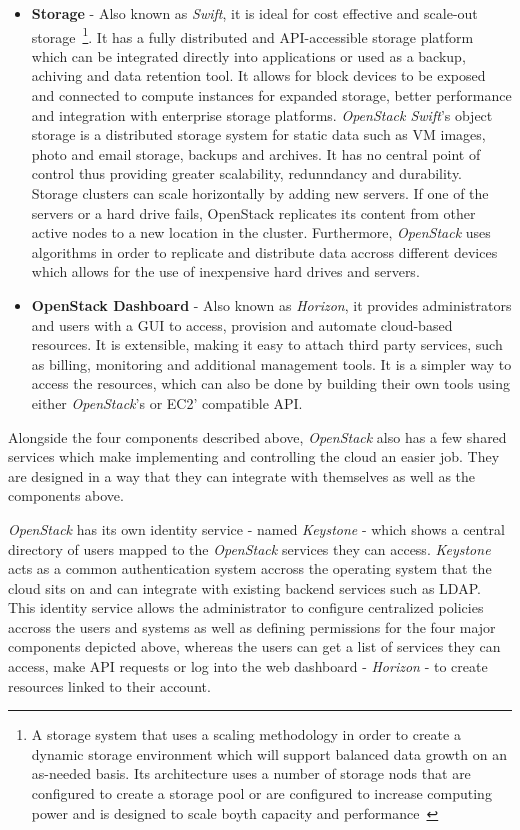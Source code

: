 \begin{itemize}
\item \textbf{Storage} - Also known as \textit{Swift}, it is ideal for cost effective and scale-out storage~\footnote{A storage system that uses a scaling methodology in order to create a dynamic storage environment which will support balanced data growth on an as-needed basis. Its architecture uses a number of storage nods that are configured to create a storage pool or are configured to increase computing power and is designed to scale boyth capacity and performance~\cite{http://www.webopedia.com/TERM/S/scale_out_storage.html}}. It has a fully distributed and API-accessible storage platform which can be integrated directly into applications or used as a backup, achiving and data retention tool. It allows for block devices to be exposed and connected to compute instances for expanded storage, better performance and integration with enterprise storage platforms. \textit{OpenStack Swift}'s object storage is a distributed storage system for static data such as VM images, photo and email storage, backups and archives. It has no central point of control thus providing greater scalability, redunndancy and durability. Storage clusters can scale horizontally by adding new servers. If one of the servers or a hard drive fails, OpenStack replicates its content from other active nodes to a new location in the cluster. Furthermore, \textit{OpenStack} uses algorithms in order to replicate and distribute data accross different devices which allows for the use of inexpensive hard drives and servers.
\item \textbf{OpenStack Dashboard} - Also known as \textit{Horizon}, it provides administrators and users with a GUI to access, provision and automate cloud-based resources. It is extensible, making it easy to attach third party services, such as billing, monitoring and additional management tools. It is a simpler way to access the resources, which can also be done by building their own tools using either \textit{OpenStack}'s or EC2' compatible API.
\end{itemize}

Alongside the four components described above, \textit{OpenStack} also has a few shared services which make implementing and controlling the cloud an easier job. They are designed in a way that they can integrate with themselves as well as the components above.

\textit{OpenStack} has its own identity service - named \textit{Keystone} - which shows a central directory of users mapped to the \textit{OpenStack} services they can access. \textit{Keystone} acts as a common authentication system accross the operating system that the cloud sits on and can integrate with existing backend services such as LDAP. This identity service allows the administrator to configure centralized policies accross the users and systems as well as defining permissions for the four major components depicted above, whereas the users can get a list of services they can access, make API requests or log into the web dashboard - \textit{Horizon} - to create resources linked to their account.

